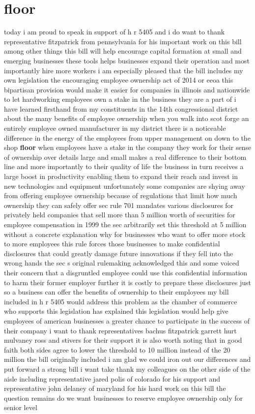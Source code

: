 \documentclass{article}
\begin{document}
\section*{floor}
today i am proud to speak in support of h r 5405 and i do want to thank representative fitzpatrick from pennsylvania for his important work on this bill among other things this bill will help encourage capital formation at small and emerging businesses these tools helps businesses expand their operation and most importantly hire more workers i am especially pleased that the bill includes my own legislation the encouraging employee ownership act of 2014 or eeoa this bipartisan provision would make it easier for companies in illinois and nationwide to let hardworking employees own a stake in the business they are a part of i have learned firsthand from my constituents in the 14th congressional district about the many benefits of employee ownership when you walk into scot forge an entirely employee owned manufacturer in my district there is a noticeable difference in the energy of the employees from upper management on down to the shop {\bf \color{red} floor} when employees have a stake in the company they work for their sense of ownership over details large and small makes a real difference to their bottom line and more importantly to their quality of life the business in turn receives a large boost in productivity enabling them to expand their reach and invest in new technologies and equipment unfortunately some companies are shying away from offering employee ownership because of regulations that limit how much ownership they can safely offer sec rule 701 mandates various disclosures for privately held companies that sell more than 5 million worth of securities for employee compensation in 1999 the sec arbitrarily set this threshold at 5 million without a concrete explanation why for businesses who want to offer more stock to more employees this rule forces those businesses to make confidential disclosures that could greatly damage future innovations if they fell into the wrong hands the sec s original rulemaking acknowledged this and some voiced their concern that a disgruntled employee could use this confidential information to harm their former employer further it is costly to prepare these disclosures just so a business can offer the benefits of ownership to their employees my bill included in h r 5405 would address this problem as the chamber of commerce who supports this legislation has explained this legislation would help give employees of american businesses a greater chance to participate in the success of their company i want to thank representatives bachus fitzpatrick garrett hurt mulvaney ross and stivers for their support it is also worth noting that in good faith both sides agree to lower the threshold to 10 million instead of the 20 million the bill originally included i am glad we could iron out our differences and put forward a strong bill i want take thank my colleagues on the other side of the aisle including representative jared polis of colorado for his support and representative john delaney of maryland for his hard work on this bill the question remains do we want businesses to reserve employee ownership only for senior level 
\end{document}
